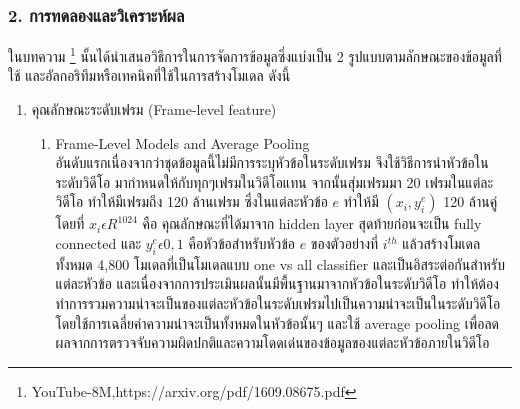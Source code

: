 \subsubsection*{2. การทดลองและวิเคราะห์ผล}
ในบทความ \footnote{YouTube-8M,https://arxiv.org/pdf/1609.08675.pdf} นั้นได้นำเสนอวิธีการในการจัดการข้อมูลซึ่งแบ่งเป็น 2 รูปแบบตามลักษณะของข้อมูลที่ใช้ และอัลกอริทึมหรือเทคนิคที่ใช้ในการสร้างโมเดล ดังนี้
\begin{enumerate}
	\setlength\itemsep{-0.25em}
	\item คุณลักษณะระดับเฟรม (Frame-level feature)
	\begin{enumerate}
		\setlength\itemsep{-0.25em}
		\item Frame-Level Models and Average Pooling
		\\ อันดับแรกเนื่องจากว่าชุดข้อมูลนี้ไม่มีการระบุหัวข้อในระดับเฟรม จึงใช้วิธีการนำหัวข้อในระดับวิดีโอ มากำหนดให้กับทุกๆเฟรมในวิดีโอแทน จากนั้นสุ่มเฟรมมา 20 เฟรมในแต่ละวิดีโอ ทำให้มีเฟรมถึง 120 ล้านเฟรม ซึ่งในแต่ละหัวข้อ $e$ ทำให้มี $(x_{i}, y_{i}^{e})$ 120 ล้านคู่ โดยที่ $x_{i} \epsilon  R^{1024}$ คือ คุณลักษณะที่ได้มาจาก hidden layer สุดท้ายก่อนจะเป็น fully connected และ $y_{i}^{e} \epsilon  0,1$ คือหัวข้อสำหรับหัวข้อ $e$ ของตัวอย่างที่ $i^{th}$ แล้วสร้างโมเดลทั้งหมด 4,800 โมเดลที่เป็นโมเดลแบบ one vs all classifier และเป็นอิสระต่อกันสำหรับแต่ละหัวข้อ และเนื่องจากการประเมินผลนั้นมีพื้นฐานมาจากหัวข้อในระดับวิดีโอ ทำให้ต้องทำการรวมความน่าจะเป็นของแต่ละหัวข้อในระดับเฟรมไปเป็นความน่าจะเป็นในระดับวิดีโอ โดยใช้การเฉลี่ยค่าความน่าจะเป็นทั้งหมดในหัวข้อนั้นๆ และใช้ average pooling เพื่อลดผลจากการตรวจจับความผิดปกติและความโดดเด่นของข้อมูลของแต่ละหัวข้อภายในวิดีโอ
		

\end{enumerate}
\end{enumerate}
